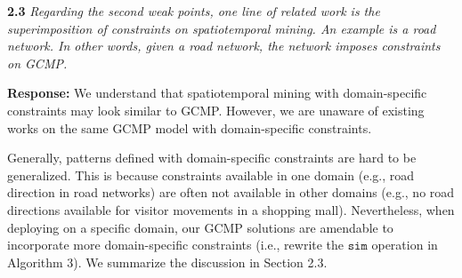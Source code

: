 %
%
%


\textbf{2.3} \emph{Regarding the second weak points, one line of related work is the superimposition
of constraints on spatiotemporal mining. An example is a road network. In other words, given a road network, the network imposes constraints on GCMP.}

\textbf{Response:} We understand that spatiotemporal mining with 
domain-specific constraints may look similar to GCMP.
However, we are unaware of existing works on the same GCMP model
 with domain-specific constraints.

Generally, patterns defined with domain-specific constraints are hard to be generalized.
This is because constraints available in one domain (e.g., road direction in road networks)
are often not available in other domains (e.g., no road directions available for visitor movements in a shopping mall). Nevertheless,
when deploying on a specific domain, our GCMP solutions are amendable to
incorporate more domain-specific constraints (i.e., rewrite the $\mathtt{sim}$ operation in Algorithm 3). 
We summarize the discussion in Section 2.3.

